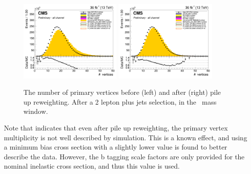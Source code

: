 \begin{figure}[htbp]
	\centering	
	\includegraphics[width=0.45\textwidth]{5_Eventselection/Figures/Reweighing/pileup/2lepcontrol_afterAtLeast1Jet_afterZWindow_NbOfVertices_all_Stack_before}
	\includegraphics[width=0.45\textwidth]{5_Eventselection/Figures/Reweighing/pileup/2lepcontrol_afterAtLeast1Jet_afterZWindow_NbOfVertices_all_Stack}
	\caption{The number of primary vertices before (left) and after (right) pile up reweighting. After a 2 lepton plus jets selection, in the \PZ\ mass window.}
	\label{fig:nbvertices}
\end{figure}

Note that  indicates that even after pile up reweighting, the primary vertex multiplicity is not well described by simulation. This is a known effect, and using  a minimum bias cross section with a slightly lower value is found to better describe the data. However, the b tagging scale factors are only provided for the nominal inelastic cross section, and thus this value is used.



